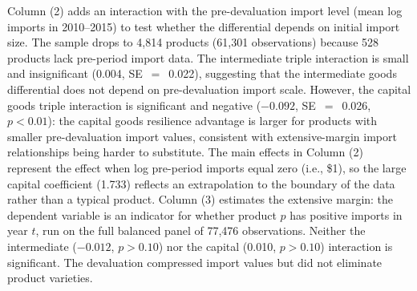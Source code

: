 \documentclass[12pt]{article}
\begin{document}
Column (2) adds an interaction with the pre-devaluation import level (mean log imports in 2010--2015) to test whether the differential depends on initial import size. The sample drops to 4,814 products (61,301 observations) because 528 products lack pre-period import data. The intermediate triple interaction is small and insignificant (0.004, SE~$=$~0.022), suggesting that the intermediate goods differential does not depend on pre-devaluation import scale. However, the capital goods triple interaction is significant and negative ($-0.092$, SE~$=$~0.026, $p < 0.01$): the capital goods resilience advantage is larger for products with smaller pre-devaluation import values, consistent with extensive-margin import relationships being harder to substitute. The main effects in Column (2) represent the effect when log pre-period imports equal zero (i.e., \$1), so the large capital coefficient (1.733) reflects an extrapolation to the boundary of the data rather than a typical product. Column (3) estimates the extensive margin: the dependent variable is an indicator for whether product $p$ has positive imports in year $t$, run on the full balanced panel of 77,476 observations. Neither the intermediate ($-0.012$, $p > 0.10$) nor the capital (0.010, $p > 0.10$) interaction is significant. The devaluation compressed import values but did not eliminate product varieties.
\end{document}
